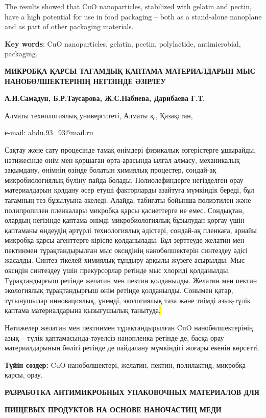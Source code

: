 The results showed that CuO nanoparticles, stabilized with gelatin and
pectin, have a high potential for use in food packaging -- both as a
stand-alone nanoplane and as part of other packaging materials.

{\bfseries Key words}: CuO nanoparticles, gelatin, pectin, polylactide,
antimicrobial, packaging.

{\bfseries МИКРОБҚА ҚАРСЫ ТАҒАМДЫҚ ҚАПТАМА МАТЕРИАЛДАРЫН МЫС
НАНОБӨЛШЕКТЕРІНІҢ НЕГІЗІНДЕ ӘЗІРЛЕУ}

{\bfseries А.И.Самадун, Б.Р.Таусарова, Ж.С.Набиева, Дарибаева Г.Т.}

Алматы технологиялық университеті, Алматы қ., Қазақстан,

е-mail: abdu.93\_93@mail.ru

Сақтау және сату процесінде тамақ өнімдері физикалық өзгерістерге
ұшырайды, нәтижесінде өнім мен қоршаған орта арасында ылғал алмасу,
механикалық зақымдану, өнімнің өзінде болатын химиялық процестер,
сондай-ақ микробиологиялық бүліну пайда болады. Полиолефиндерге
негізделген орау материалдарын қолдану әсер етуші факторларды азайтуға
мүмкіндік береді, бұл тағамның тез бұзылуына әкеледі. Алайда, табиғаты
бойынша полиэтилен және полипропилен пленкалары микробқа қарсы
қасиеттерге ие емес. Сондықтан, олардың негізінде қаптама өнімді
микробиологиялық бұзылудан қорғау үшін қаптаманы өңдеудің әртүрлі
технологиялық әдістері, сондай-ақ пленкаға, арнайы микробқа қарсы
агенттерге кіріспе қолданылады. Бұл зерттеуде желатин мен пектинмен
тұрақтандырылған мыс оксидінің нанобөлшектерін синтездеу әдісі жасалды.
Синтез тікелей химиялық тұндыру арқылы жүзеге асырылды. Мыс оксидін
синтездеу үшін прекурсорлар ретінде мыс хлориді қолданылды.
Тұрақтандырғыш ретінде желатин мен пектин қолданылды. Желатин мен пектин
экологиялық тұрақтандырғыш өнім ретінде қолданылды. Сонымен қатар,
тұтынушылар инновациялық, үнемді, экологиялық таза және тиімді
азық-түлік қаптама материалдарына қызығушылық танытуда\hl{.}

Нәтижелер желатин мен пектинмен тұрақтандырылған CuO нанобөлшектерінің
азық -- түлік қаптамасында-тәуелсіз нанопленка ретінде де, басқа орау
материалдарының бөлігі ретінде де пайдалану мүмкіндігі жоғары екенін
көрсетті.

{\bfseries Түйін сөздер:} CuO нанобөлшектері, желатин, пектин, полилактид,
микробқа қарсы, орау.

{\bfseries РАЗРАБОТКА АНТИМИКРОБНЫХ УПАКОВОЧНЫХ МАТЕРИАЛОВ ДЛЯ}

{\bfseries ПИЩЕВЫХ ПРОДУКТОВ НА ОСНОВЕ НАНОЧАСТИЦ МЕДИ}

